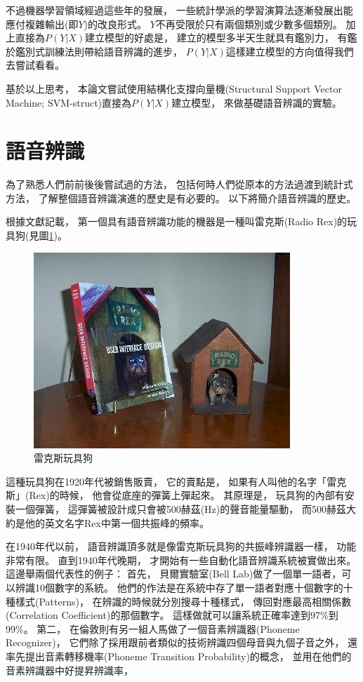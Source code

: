 不過機器學習領域經過這些年的發展，
一些統計學派的學習演算法逐漸發展出能應付複雜輸出(即$Y$)的改良形式。
$Y$不再受限於只有兩個類別或少數多個類別。
加上直接為$P(Y|X)$建立模型的好處是，
建立的模型多半天生就具有鑑別力，
有鑑於鑑別式訓練法則帶給語音辨識的進步，
$P(Y|X)$這樣建立模型的方向值得我們去嘗試看看。

基於以上思考，
本論文嘗試使用結構化支撐向量機(Structural Support Vector Machine; SVM-struct)直接為$P(Y|X)$建立模型，
來做基礎語音辨識的實驗。

\section{語音辨識}
為了熟悉人們前前後後嘗試過的方法，
包括何時人們從原本的方法過渡到統計式方法，
了解整個語音辨識演進的歷史是有必要的。
以下將簡介語音辨識的歷史。

根據文獻\cite{Jurafsky}記載，
第一個具有語音辨識功能的機器是一種叫雷克斯(Radio Rex)的玩具狗(見圖\ref{fig:radio_rex})。
\begin{figure}
  \centering
  \includegraphics[scale=0.5]{images/radio_rex.jpg}
  \caption{雷克斯玩具狗} \label{fig:radio_rex}
\end{figure}
這種玩具狗在1920年代被銷售販賣，
它的賣點是，
如果有人叫他的名字「雷克斯」(Rex)的時候，
他會從底座的彈簧上彈起來。
其原理是，
玩具狗的內部有安裝一個彈簧，
這彈簧被設計成只會被500赫茲(Hz)的聲音能量驅動，
而500赫茲大約是他的英文名字Rex中第一個共振峰的頻率。

在1940年代以前，
語音辨識頂多就是像雷克斯玩具狗的共振峰辨識器一樣，
功能非常有限。
直到1940年代晚期，
才開始有一些自動化語音辨識系統被實做出來。
這邊舉兩個代表性的例子：
首先，
貝爾實驗室(Bell Lab)做了一個單一語者，可以辨識10個數字的系統。
他們的作法是在系統中存了單一語者對應十個數字的十種樣式(Patterns)，
在辨識的時候就分別搜尋十種樣式，
傳回對應最高相關係數(Correlation Coefficient)的那個數字。
這樣做就可以讓系統正確率達到97\%到99\%。
第二，
在倫敦則有另一組人馬做了一個音素辨識器(Phoneme Recognizer)，
它們除了採用跟前者類似的技術辨識四個母音與九個子音之外，
還率先提出音素轉移機率(Phoneme Transition Probability)的概念，
並用在他們的音素辨識器中好提昇辨識率，

